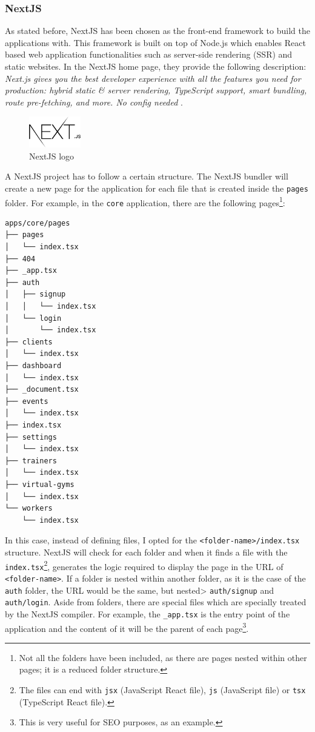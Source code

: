\documentclass[a4paper, 12pt, oneside]{book}
\begin{document}
\subsubsection{NextJS}
As stated before, NextJS has been chosen as the front-end framework to build the applications with. This framework is built on top of Node.js which enables React based web application functionalities such as server-side rendering (SSR) and static websites. In the NextJS home page, they provide the following description: \emph{Next.js gives you the best developer experience with all the features you need for production: hybrid static \& server rendering, TypeScript support, smart bundling, route pre-fetching, and more. No config needed} \cite{nextjs}.
\begin{figure}[H]
	\centering
	\includegraphics[width=0.2\textwidth]{assets/next-logo.png}
	\caption{NextJS logo}
\end{figure}
A NextJS project has to follow a certain structure. The NextJS bundler will create a new page for the application for each file that is created inside the \texttt{pages} folder. For example, in the \texttt{core} application, there are the following pages\footnote{Not all the folders have been included, as there are pages nested within other pages; it is a reduced folder structure.}:
\begin{verbatim}
apps/core/pages
├── pages
│   └── index.tsx
├── 404
├── _app.tsx
├── auth
│   ├── signup
│   │   └── index.tsx
│   └── login
│       └── index.tsx
├── clients
│   └── index.tsx
├── dashboard
│   └── index.tsx
├── _document.tsx
├── events
│   └── index.tsx
├── index.tsx
├── settings
│   └── index.tsx
├── trainers
│   └── index.tsx
├── virtual-gyms
│   └── index.tsx
└── workers
    └── index.tsx
\end{verbatim}
In this case, instead of defining files, I opted for the \texttt{<folder-name>/index.tsx} structure. NextJS will check for each folder and when it finds a file with the \texttt{index.tsx}\footnote{The files can end with \texttt{jsx} (JavaScript React file), \texttt{js} (JavaScript file) or \texttt{tsx} (TypeScript React file).}, generates the logic required to display the page in the URL of \texttt{<folder-name>}. If a folder is nested within another folder, as it is the case of the \texttt{auth} folder, the URL would be the same, but nested> \texttt{auth/signup} and \texttt{auth/login}. Aside from folders, there are special files which are specially treated by the NextJS compiler. For example, the \texttt{\_app.tsx} is the entry point of the application and the content of it will be the parent of each page\footnote{This is very useful for SEO purposes, as an example.}.
\end{document}
